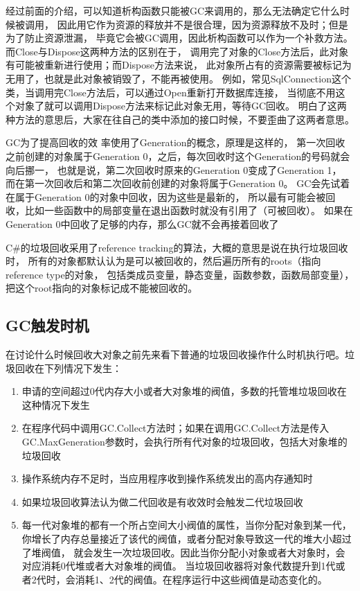 \documentclass{book}
\begin{document}
经过前面的介绍，可以知道析构函数只能被GC来调用的，那么无法确定它什么时候被调用，
因此用它作为资源的释放并不是很合理，因为资源释放不及时；但是为了防止资源泄漏，
毕竟它会被GC调用，因此析构函数可以作为一个补救方法。而Close与Dispose这两种方法的区别在于，
调用完了对象的Close方法后，此对象有可能被重新进行使用；而Dispose方法来说，
此对象所占有的资源需要被标记为无用了，也就是此对象被销毁了，不能再被使用。
例如，常见SqlConnection这个类，当调用完Close方法后，可以通过Open重新打开数据库连接，
当彻底不用这个对象了就可以调用Dispose方法来标记此对象无用，等待GC回收。
明白了这两种方法的意思后，大家在往自己的类中添加的接口时候，不要歪曲了这两者意思。
 
GC为了提高回收的效 率使用了Generation的概念，原理是这样的，
第一次回收之前创建的对象属于Generation 0，之后，每次回收时这个Generation的号码就会向后挪一，
也就是说，第二次回收时原来的Generation 0变成了Generation 1，
而在第一次回收后和第二次回收前创建的对象将属于Generation 0。
GC会先试着在属于Generation 0的对象中回收，因为这些是最新的，
所以最有可能会被回收，比如一些函数中的局部变量在退出函数时就没有引用了（可被回收）。
如果在Generation 0中回收了足够的内存，那么GC就不会再接着回收了

C\#的垃圾回收采用了reference tracking的算法，大概的意思是说在执行垃圾回收时，
所有的对象都默认认为是可以被回收的，然后遍历所有的roots（指向reference type的对象，
包括类成员变量，静态变量，函数参数，函数局部变量），把这个root指向的对象标记成不能被回收的。

\subsection{GC触发时机}

在讨论什么时候回收大对象之前先来看下普通的垃圾回收操作什么时机执行吧。垃圾回收在下列情况下发生：

\begin{enumerate}
	\setcounter{enumi}{0}
	\item{申请的空间超过0代内存大小或者大对象堆的阀值，多数的托管堆垃圾回收在这种情况下发生}
	\item{在程序代码中调用GC.Collect方法时；如果在调用GC.Collect方法是传入GC.MaxGeneration参数时，会执行所有代对象的垃圾回收，包括大对象堆的垃圾回收}
	\item{操作系统内存不足时，当应用程序收到操作系统发出的高内存通知时}
	\item{如果垃圾回收算法认为做二代回收是有收效时会触发二代垃圾回收}
	\item{每一代对象堆的都有一个所占空间大小阀值的属性，当你分配对象到某一代，
		你增长了内存总量接近了该代的阀值，或者分配对象导致这一代的堆大小超过了堆阀值，
		就会发生一次垃圾回收。因此当你分配小对象或者大对象时，会对应消耗0代堆或者大对象堆的阀值。
		当垃圾回收器将对象代数提升到1代或者2代时，会消耗1、2代的阀值。在程序运行中这些阀值是动态变化的。}
\end{enumerate}
\end{document}
